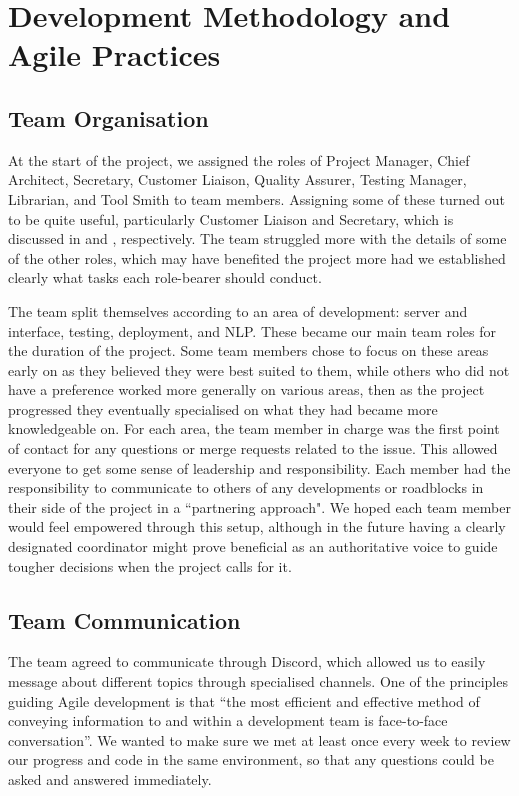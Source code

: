 \documentclass{l3proj}
\begin{document}

\section{Development Methodology and Agile Practices}
\label{sec:methodology}

\subsection{Team Organisation}

At the start of the project, we assigned the roles of Project Manager, Chief Architect, Secretary, Customer Liaison, Quality Assurer, Testing Manager, Librarian, and Tool Smith to team members. Assigning some of these turned out to be quite useful, particularly Customer Liaison and Secretary, which is discussed in  and , respectively. The team struggled more with the details of some of the other roles, which may have benefited the project more had we established clearly what tasks each role-bearer should conduct.

The team split themselves according to an area of development: server and interface, testing, deployment, and NLP. These became our main team roles for the duration of the project. Some team members chose to focus on these areas early on as they believed they were best suited to them, while others who did not have a preference worked more generally on various areas, then as the project progressed they eventually specialised on what they had became more knowledgeable on. For each area, the team member in charge was the first point of contact for any questions or merge requests related to the issue. This allowed everyone to get some sense of leadership and responsibility. Each member had the responsibility to communicate to others of any developments or roadblocks in their side of the project in a ``partnering approach"\cite{leadership:Farley}. We hoped each team member would feel empowered through this setup, although in the future having a clearly designated coordinator might prove beneficial as an authoritative voice to guide tougher decisions when the project calls for it.

\subsection{Team Communication}
The team agreed to communicate through Discord, which allowed us to easily message about different topics through specialised channels. One of the principles guiding Agile development is that “the most efficient and effective method of conveying information to and within a development team is face-to-face conversation”\cite{agilemanifesto}. We wanted to make sure we met at least once every week to review our progress and code in the same environment, so that any questions could be asked and answered immediately.
\end{document}
